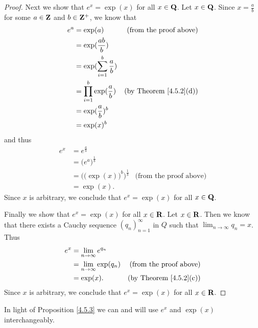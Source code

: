 \begin{proof}
    Next we show that \(e^x = \exp(x)\) for all \(x \in \mathbf{Q}\).
    Let \(x \in \mathbf{Q}\).
    Since \(x = \frac{a}{b}\) for some \(a \in \mathbf{Z}\) and \(b \in \mathbf{Z}^+\), we know that
    \begin{align*}
        e^a & = \exp(a)                           & \text{(from the proof above)}      \\
            & = \exp(\frac{ab}{b})                                                     \\
            & = \exp(\sum_{i = 1}^b \frac{a}{b})                                       \\
            & = \prod_{i = 1}^b \exp(\frac{a}{b}) & \text{(by Theorem \ref{4.5.2}(d))} \\
            & = \exp(\frac{a}{b})^b                                                    \\
            & = \exp(x)^b
    \end{align*}
    and thus
    \begin{align*}
        e^x & = e^{\frac{a}{b}}                                                             \\
            & = \big(e^a\big)^{\frac{1}{b}}                                                 \\
            & = \Big(\big(\exp(x)\big)^b\Big)^{\frac{1}{b}} & \text{(from the proof above)} \\
            & = \exp(x).
    \end{align*}
    Since \(x\) is arbitrary, we conclude that \(e^x = \exp(x)\) for all \(x \in \mathbf{Q}\).

    Finally we show that \(e^x = \exp(x)\) for all \(x \in \mathbf{R}\).
    Let \(x \in \mathbf{R}\).
    Then we know that there exists a Cauchy sequence \((q_n)_{n = 1}^\infty\) in \(Q\) such that \(\lim_{n \to \infty} q_n = x\).
    Thus
    \begin{align*}
        e^x & = \lim_{n \to \infty} e^{q_n}                                        \\
            & = \lim_{n \to \infty} \exp(q_n) & \text{(from the proof above)}      \\
            & = \exp(x).                      & \text{(by Theorem \ref{4.5.2}(c))}
    \end{align*}
    Since \(x\) is arbitrary, we conclude that \(e^x = \exp(x)\) for all \(x \in \mathbf{R}\).
\end{proof}

\begin{note}
    In light of Proposition \ref{4.5.3} we can and will use \(e^x\) and \(\exp(x)\) interchangeably.
\end{note}

